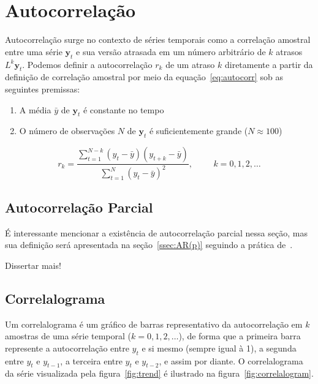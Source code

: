 \section{Autocorrelação}

Autocorrelação surge no contexto de séries temporais como a correlação amostral
entre uma série $\mathbf{y}_t$ e sua versão atrasada em um número arbitrário de
$k$ atrasos $L^k \mathbf{y}_t$. Podemos definir a autocorrelação $r_k$ de um
atraso $k$ diretamente a partir da definição de correlação amostral por meio da
equação~\ref{eq:autocorr} sob as seguintes premissas:

\begin{enumerate}
    \item A média $\bar{y}$ de $\mathbf{y}_t$ é constante no tempo
    \item O número de observações  $N$ de $\mathbf{y}_t$ é suficientemente
    grande ($N \approx 100$)
\end{enumerate}

\vspace{1cm}

\begin{equation}\label{eq:autocorr}
    r_k = \frac{\sum_{t=1}^{N-k}(y_t - \bar{y})(y_{t+k}-\bar{y})}{\sum_{t=1}^{N}(y_t - \bar{y})^2}  , \hspace{1cm} k = 0, 1, 2, \dots
\end{equation}

\vspace{1cm}

\subsection{Autocorrelação Parcial}

É interessante mencionar a existência de autocorrelação parcial nessa seção,
mas sua definição será apresentada na seção~\ref{ssec:AR(p)} seguindo a
prática de~\cite{chatfield}.

Dissertar mais!

\subsection{Correlalograma}\label{ssec:correlalogram}

Um correlalograma é um gráfico de barras representativo da autocorrelação em
$k$ amostras de uma série temporal ($k=0, 1, 2, \dots$), de forma que a
primeira barra represente a autocorrelação entre $y_t$ e si mesmo (sempre igual
à 1), a segunda entre $y_t$ e $y_{t-1}$, a terceira entre $y_t$ e $y_{t-2}$, e
assim por diante. O correlalograma da série visualizada pela
figura~\ref{fig:trend} é ilustrado na figura~\ref{fig:correlalogram}.

